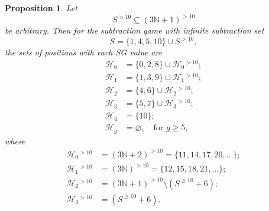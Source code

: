 \documentclass[11pt]{article}
\newtheorem{proposition}{Proposition}[section]
\theoremstyle{definition}
\theoremstyle{plain}
\begin{document}
\begin{proposition}\label{main_prop}
    Let
    \[
        S^{>10} \subseteq (3\mathbb{N}+1)^{>10}
    \]
    be arbitrary.
    Then for the subtraction game with infinite subtraction set
    \[
        S=\{1, 4, 5, 10\} \cup S^{>10},
    \]
    the sets of positions with each SG value are
    \begin{align*}
        \mathcal{H}_0 &= \{0, 2, 8\} \cup \mathcal{H}_0{}^{>10}; \\
        \mathcal{H}_1 &= \{1, 3, 9\} \cup \mathcal{H}_1{}^{>10}; \\
        \mathcal{H}_2 &= \{4, 6\} \cup \mathcal{H}_2{}^{>10}; \\
        \mathcal{H}_3 &= \{5, 7\} \cup \mathcal{H}_3{}^{>10}; \\
        \mathcal{H}_4 &= \{10\}; \\
        \mathcal{H}_g &= \varnothing, \quad \text{for } g\geq 5,
    \end{align*}
    where
    \begin{align*}
        \mathcal{H}_0{}^{>10} &= (3\mathbb{N}+2)^{>10} = \{11, 14, 17, 20,\ldots\}; \\
        \mathcal{H}_1{}^{>10} &= (3\mathbb{N})^{>10} = \{12, 15, 18, 21,\ldots\}; \\
        \mathcal{H}_2{}^{>10} &= (3\mathbb{N}+1)^{>10} \setminus (S^{\geq 10}+6); \\
        \mathcal{H}_3{}^{>10} &= (S^{\geq 10}+6).
    \end{align*}
\end{proposition}
\end{document}
